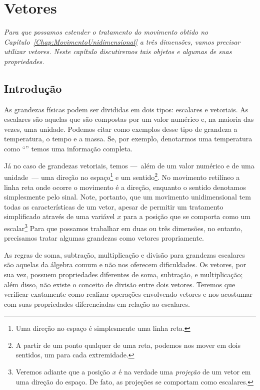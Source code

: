 \chapter{Vetores}
\label{Chap:Vetores}


\begin{fullwidth}
{\it
Para que possamos estender o tratamento do movimento obtido no Capítulo~\ref{Chap:MovimentoUnidimensional} a três dimensões, vamos precisar utilizar vetores. Neste capítulo discutiremos tais objetos e algumas de suas propriedades.
}
\end{fullwidth}

\section{Introdução}

As grandezas físicas podem ser divididas em dois tipos: escalares e vetoriais. As escalares são aquelas que são compostas por um valor numérico e, na maioria das vezes, uma unidade. Podemos citar como exemplos desse tipo de grandeza a temperatura, o tempo e a massa. Se, por exemplo, denotarmos uma temperatura como ``'' temos uma informação completa.

Já no caso de grandezas vetoriais, temos ---~além de um valor numérico e de uma unidade~--- uma direção no espaço\footnote{Uma direção no espaço é simplesmente uma linha reta.} e um sentido\footnote{A partir de um ponto qualquer de uma reta, podemos nos mover em dois sentidos, um para cada extremidade.}. No movimento retilíneo a linha reta onde ocorre o movimento é a direção, enquanto o sentido denotamos simplesmente pelo sinal. Note, portanto, que um movimento unidimensional tem todas as características de um vetor, apesar de permitir um tratamento simplificado através de uma variável $x$ para a posição que se comporta como um escalar\footnote{Veremos adiante que a posição $x$ é na verdade uma \emph{projeção} de um vetor em uma direção do espaço. De fato, as projeções se comportam como escalares.} Para que possamos trabalhar em duas ou três dimensões, no entanto, precisamos tratar algumas grandezas como vetores propriamente.

As regras de soma, subtração, multiplicação e divisão para grandezas escalares são aquelas da álgebra comum e não nos oferecem dificuldades. Os vetores, por sua vez, possuem propriedades diferentes de soma, subtração, e multiplicação; além disso, não existe o conceito de divisão entre dois vetores. Teremos que verificar exatamente como realizar operações envolvendo vetores e nos acostumar com suas propriedades diferenciadas em relação ao escalares.

